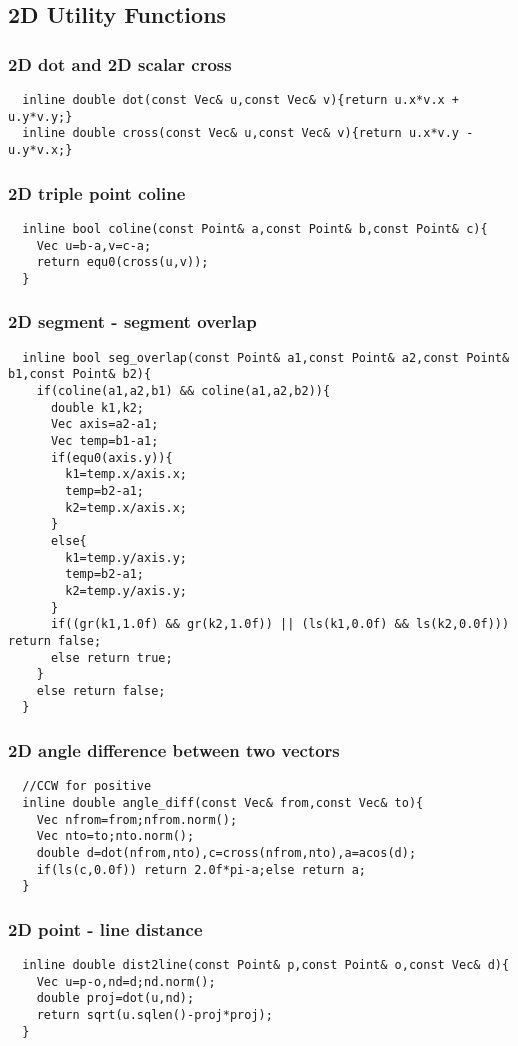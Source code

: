 \documentclass[a4paper]{article}
\begin{document}
\subsection{2D Utility Functions}
\subsubsection{2D dot and 2D scalar cross}
\begin{lstlisting}
  inline double dot(const Vec& u,const Vec& v){return u.x*v.x + u.y*v.y;}
  inline double cross(const Vec& u,const Vec& v){return u.x*v.y - u.y*v.x;}
\end{lstlisting}
\subsubsection{2D triple point coline}
\begin{lstlisting}
  inline bool coline(const Point& a,const Point& b,const Point& c){
    Vec u=b-a,v=c-a;
    return equ0(cross(u,v));
  }
\end{lstlisting}
\subsubsection{2D segment - segment overlap}
\begin{lstlisting}
  inline bool seg_overlap(const Point& a1,const Point& a2,const Point& b1,const Point& b2){
    if(coline(a1,a2,b1) && coline(a1,a2,b2)){
      double k1,k2;
      Vec axis=a2-a1;
      Vec temp=b1-a1;
      if(equ0(axis.y)){
        k1=temp.x/axis.x;
        temp=b2-a1;
        k2=temp.x/axis.x;
      }
      else{
        k1=temp.y/axis.y;
        temp=b2-a1;
        k2=temp.y/axis.y;
      }
      if((gr(k1,1.0f) && gr(k2,1.0f)) || (ls(k1,0.0f) && ls(k2,0.0f))) return false;
      else return true;
    }
    else return false;
  }
\end{lstlisting}
\subsubsection{2D angle difference between two vectors}
\begin{lstlisting}
  //CCW for positive
  inline double angle_diff(const Vec& from,const Vec& to){
    Vec nfrom=from;nfrom.norm();
    Vec nto=to;nto.norm();
    double d=dot(nfrom,nto),c=cross(nfrom,nto),a=acos(d);
    if(ls(c,0.0f)) return 2.0f*pi-a;else return a;
  }
\end{lstlisting}
\subsubsection{2D point - line distance}
\begin{lstlisting}
  inline double dist2line(const Point& p,const Point& o,const Vec& d){
    Vec u=p-o,nd=d;nd.norm();
    double proj=dot(u,nd);
    return sqrt(u.sqlen()-proj*proj);
  }
\end{lstlisting}
\end{document}
